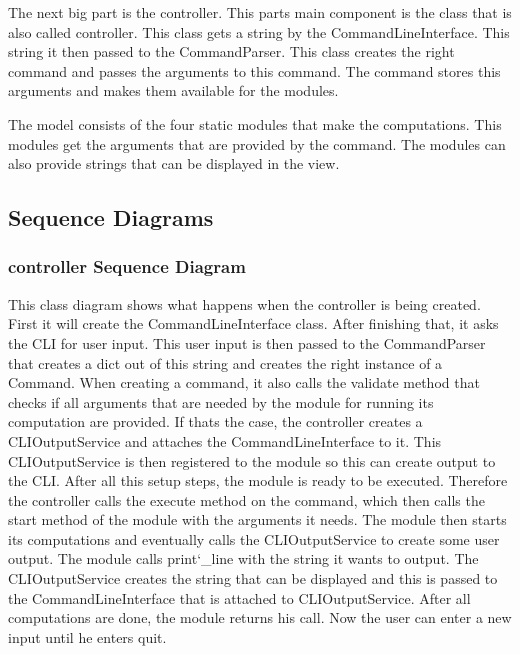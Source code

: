 \documentclass[parskip=full]{scrartcl}
\begin{document}
The next big part is the controller.
This parts main component is the class that is also called controller.
This class gets a string by the CommandLineInterface.
This string it then passed to the CommandParser.
This class creates the right command and passes the arguments to this command.
The command stores this arguments and makes them available for the modules.

The model consists of the four static modules that make the computations.
This modules get the arguments that are provided by the command.
The modules can also provide strings that can be displayed in the view.

\newpage

\subsection{Sequence Diagrams}

\subsubsection{controller Sequence Diagram}

\begin{figure}[h]
\begin{center}

\label{controller Sequence Diagram}
\end{center}
\end{figure}
\newpage

This class diagram shows what happens when the controller is being created.
First it will create the CommandLineInterface class.
After finishing that, it asks the \gls{CLI} for user input.
This user input is then passed to the CommandParser that creates a dict out of this string and creates the right instance of a Command.
When creating a command, it also calls the validate method that checks if all arguments that are needed by the module for running its computation are provided.
If thats the case, the controller creates a CLIOutputService and attaches the CommandLineInterface to it.
This CLIOutputService is then registered to the module so this can create output to the \gls{CLI}.
After all this setup steps, the module is ready to be executed.
Therefore the controller calls the execute method on the command, which then calls the start method of the module with the arguments it needs.
The module then starts its computations and eventually calls the CLIOutputService to create some user output.
The module calls print\char`_line with the string it wants to output.
The CLIOutputService creates the string that can be displayed and this is passed to the CommandLineInterface that is attached to CLIOutputService.
After all computations are done, the module returns his call.
Now the user can enter a new input until he enters quit.
\end{document}
